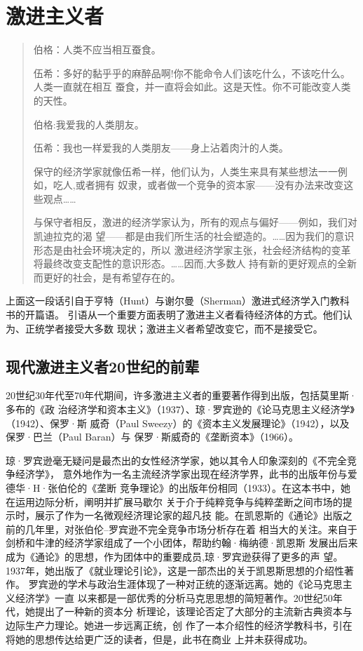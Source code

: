 \section{激进主义者}

\begin{quotation}
伯格：人类不应当相互蚕食。

伍希：多好的黏乎乎的麻醉品啊!你不能命令人们该吃什么，不该吃什么。人类一直就在相互
蚕食，并一直将会如此。这是天性。你不可能改变人类的天性。

伯格:我爱我的人类朋友。

伍希：我也一样爱我的人类朋友——身上沾着肉汁的人类。

\bigskip

保守的经济学家就像伍希一样，他们认为，人类生来具有某些想法一一例如，吃人,或者拥有
奴隶，或者做一个竞争的资本家——没有办法来改变这些观点……

与保守者相反，激进的经济学家认为，所有的观点与偏好——例如，我们对凯迪拉克的渴
望——都是由我们所生活的社会塑造的。……因为我们的意识形态是由社会环境决定的，所以
激进经济学家主张，社会经济结构的变革将最终改变支配性的意识形态。……因而,大多数人
持有新的更好观点的全新而更好的社会，是有希望存在的。
\end{quotation}

上面这一段话引自于亨特（Hunt）与谢尔曼（Sherman）激进式经济学入门教科书的开篇语。
引语从一个重要方面表明了激进主义者看待经济体的方式。他们认为、正统学者接受大多数
现状；激进主义者希望改变它，而不是接受它。


\subsection{现代激进主义者20世纪的前辈}

20世纪30年代至70年代期间，许多激进主义者的重要著作得到出版，包括莫里斯·多布的《政
治经济学和资本主义》（1937）、琼·罗宾逊的《论马克思主义经济学》（1942）、保罗·斯
威奇（Paul Sweezy）的《资本主义发展理论》（1942），以及保罗·巴兰（Paul Baran）与
保罗·斯威奇的《垄断资本》（1966）。

琼·罗宾逊毫无疑问是最杰出的女性经济学家，她以其令人印象深刻的《不完全竞争经济学》，
意外地作为一名主流经济学家出现在经济学界，此书的出版年份与爱德华·H·张伯伦的《垄断
竞争理论》的出版年份相同（1933）。在这本书中，她在运用边际分析，阐明并扩展马歇尔
关于介于纯粹竞争与纯粹垄断之间市场的提示时，展示了作为一名微观经济理论家的超凡技
能。在凯恩斯的《通论》出版之前的几年里，对张伯伦--罗宾逊不完全竞争市场分析存在着
相当大的关注。来自于剑桥和牛津的经济学家组成了一个小团体，帮助约翰·梅纳德·凯恩斯
发展出后来成为《通论》的思想，作为团体中的重要成员,琼·罗宾逊获得了更多的声
望。1937年，她出版了《就业理论引论》，这是一部杰出的关于凯恩斯思想的介绍性著作。
罗宾逊的学术与政治生涯体现了一种对正统的逐渐远离。她的《论马克思主义经济学》一直
以来都是一部优秀的分析马克思思想的简短著作。20世纪50年代，她提出了一种新的资本分
析理论，该理论否定了大部分的主流新古典资本与边际生产力理论。她进一步远离正统，创
作了一本介绍性的经济学教科书，引在将她的思想传达给更广泛的读者，但是，此书在商业
上并未获得成功。


